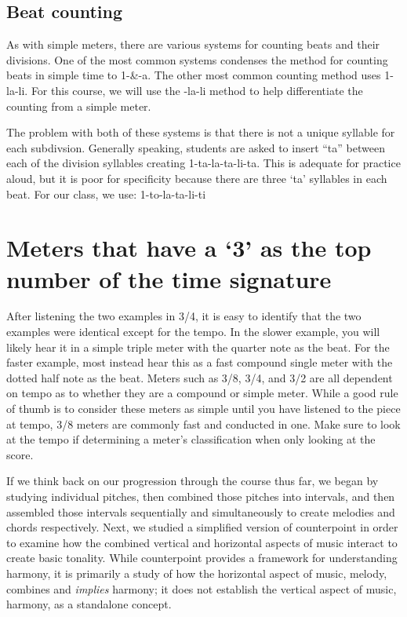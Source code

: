 \documentclass{book}
\begin{document}
\hypertarget{beat-counting}{%
\subsection{Beat counting}\label{beat-counting}}

As with simple meters, there are various systems for counting beats and their
divisions. One of the most common systems condenses the method for counting
beats in simple time to 1-\&-a. The other most common counting method uses
1-la-li. For this course, we will use the -la-li method to help differentiate
the counting from a simple meter.

The problem with both of these systems is that there is not a unique syllable
for each subdivsion. Generally speaking, students are asked to insert ``ta''
between each of the division syllables creating 1-ta-la-ta-li-ta. This is
adequate for practice aloud, but it is poor for specificity because there are
three `ta' syllables in each beat. For our class, we use: 1-to-la-ta-li-ti

\hypertarget{meters-that-have-a-3-as-the-top-number-of-the-time-signature}{%
\section{Meters that have a `3' as the top number of the time
signature}\label{meters-that-have-a-3-as-the-top-number-of-the-time-signature}}

After listening the two examples in 3/4, it is easy to identify that the two
examples were identical except for the tempo. In the slower example, you will
likely hear it in a simple triple meter with the quarter note as the beat. For
the faster example, most instead hear this as a fast compound single meter
with the dotted half note as the beat. Meters such as 3/8, 3/4, and 3/2 are
all dependent on tempo as to whether they are a compound or simple meter.
While a good rule of thumb is to consider these meters as simple until you
have listened to the piece at tempo, 3/8 meters are commonly fast and
conducted in one. Make sure to look at the tempo if determining a meter's
classification when only looking at the score.

If we think back on our progression through the course thus far, we began by
studying individual pitches, then combined those pitches into intervals, and
then assembled those intervals sequentially and simultaneously to create
melodies and chords respectively. Next, we studied a simplified version of
counterpoint in order to examine how the combined vertical and horizontal
aspects of music interact to create basic tonality. While counterpoint
provides a framework for understanding harmony, it is primarily a study of how
the horizontal aspect of music, melody, combines and \emph{implies} harmony;
it does not establish the vertical aspect of music, harmony, as a standalone
concept.
\end{document}
